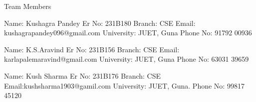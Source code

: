 \documentclass[12pt,a4paper]{report}
\begin{document}
Team Members



Name: Kushagra Pandey
Er No: 231B180
Branch: CSE
Email: kushagrapandey096@gmail.com
University: JUET, Guna
Phone No: 91792 00936





Name: K.S.Aravind
Er No: 231B156
Branch: CSE
Email: karlapalemaravind@gmail.com
University: JUET, Guna
Phone No:  63031 39659






Name: Kush Sharma
Er No: 231B176
Branch: CSE
Email:kushsharma1903@gamil.com
University: JUET, Guna.
Phone No: 99817 45120
\end{document}
